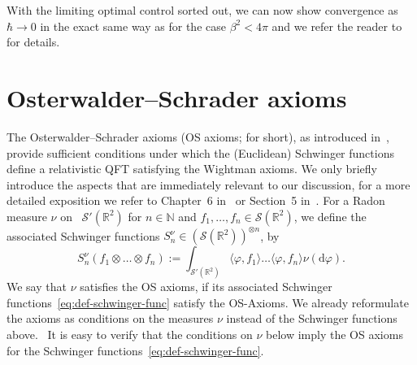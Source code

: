 \documentclass[11pt, a4paper]{scrartcl}
\numberwithin{equation}{section}
\theoremstyle{plain}
\theoremstyle{remark}
\newcommand{\assign}{:=}
\newcommand{\mathd}{\mathrm{d}}
\begin{document}
With the limiting optimal control sorted out, we can now show convergence as
$\hbar \rightarrow 0$ in the exact same way as for the case $\beta^2 < 4 \pi$
and we refer the reader to~{\cite[Section
	5]{barashkovStochasticControlApproach2022}} for details.

\section{Osterwalder--Schrader axioms}\label{sec:OS-Axioms}
The Osterwalder--Schrader axioms (OS axioms; for short), as introduced
in~{\cite{osterwalderAxiomsEuclideanGreens1973,osterwalderAxiomsEuclideanGreens1975}},
provide sufficient conditions under which the (Euclidean) Schwinger functions
define a relativistic QFT satisfying the Wightman axioms. We only briefly
introduce the aspects that are immediately relevant to our discussion, for a
more detailed exposition we refer to Chapter~6
in~{\cite{glimmQuantumPhysicsFunctional2012}} or Section~5
in~{\cite{gubinelliPDEConstructionEuclidean2021}}. For a Radon measure $\nu$
on \ $\mathcal{S}' (\mathbb{R}^2)$ for $n \in \mathbb{N}$ and $f_1, \ldots,
	f_n \in \mathcal{S} (\mathbb{R}^2)$, we define the associated Schwinger
functions $S^{\nu}_n \in (\mathcal{S} (\mathbb{R}^2))^{\otimes n}$, by
\begin{equation}
	S^{\nu}_n (f_1 \otimes \ldots \otimes f_n) \assign \int_{\mathcal{S}'
		(\mathbb{R}^2)} \langle \varphi, f_1 \rangle \ldots \langle \varphi, f_n
	\rangle \nu (\mathd \varphi) . \label{eq:def-schwinger-func}
\end{equation}
We say that $\nu$ satisfies the OS axioms, if its associated Schwinger
functions~\eqref{eq:def-schwinger-func} satisfy the OS-Axioms. We already
reformulate the axioms as conditions on the measures $\nu$ instead of the
Schwinger functions above. \ It is easy to verify that the conditions on $\nu$
below imply the OS axioms for the Schwinger
functions~\eqref{eq:def-schwinger-func}.
\end{document}
